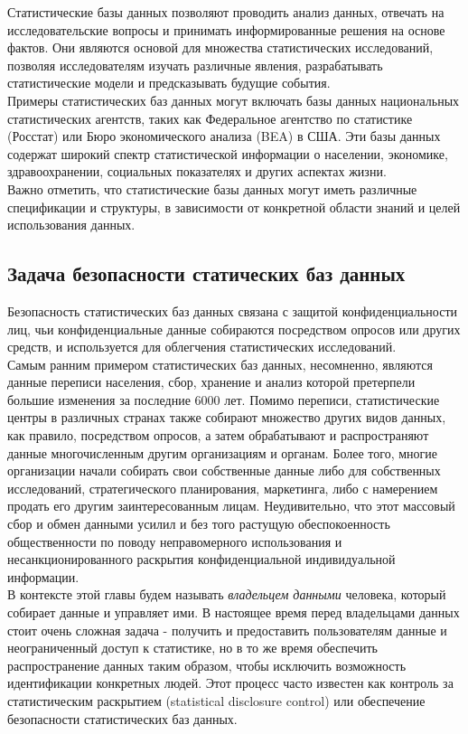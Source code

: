 Статистические базы данных позволяют проводить анализ данных, отвечать на исследовательские вопросы и принимать информированные решения на основе фактов. Они являются основой для множества статистических исследований, позволяя исследователям изучать различные явления, разрабатывать статистические модели и предсказывать будущие события.
\\

Примеры статистических баз данных могут включать базы данных национальных статистических агентств, таких как Федеральное агентство по статистике (Росстат) или Бюро экономического анализа (BEA) в США. Эти базы данных содержат широкий спектр статистической информации о населении, экономике, здравоохранении, социальных показателях и других аспектах жизни.
\\

Важно отметить, что статистические базы данных могут иметь различные спецификации и структуры, в зависимости от конкретной области знаний и целей использования данных.

\subsection{Задача безопасности статических баз данных}
Безопасность статистических баз данных связана с защитой конфиденциальности лиц, чьи конфиденциальные данные собираются посредством опросов или других средств, и
используется для облегчения статистических исследований. 
\\

Самым ранним примером статистических баз данных, несомненно, являются данные переписи населения,
сбор, хранение и анализ которой претерпели большие изменения
за последние 6000 лет. Помимо переписи, статистические центры 
в различных странах также собирают множество других видов данных, как правило, посредством опросов, а затем обрабатывают и распространяют данные многочисленным другим организациям и органам. Более того, многие организации начали собирать свои собственные данные либо для собственных исследований, стратегического планирования, маркетинга, либо с намерением продать его другим заинтересованным лицам. Неудивительно, что этот массовый сбор и обмен данными усилил и без того растущую обеспокоенность общественности по поводу неправомерного использования и несанкционированного раскрытия конфиденциальной индивидуальной информации.
\\

В контексте этой главы будем называть \textit{владельцем данными} человека, который собирает данные и управляет ими.
В настоящее время перед владельцами данных стоит очень сложная задача - получить и предоставить
пользователям данные и неограниченный доступ к статистике, но в то же время обеспечить распространение данных таким образом, чтобы исключить возможность идентификации конкретных людей. Этот процесс часто известен как контроль за статистическим раскрытием (statistical disclosure control) или обеспечение безопасности статистических баз данных.
\\

